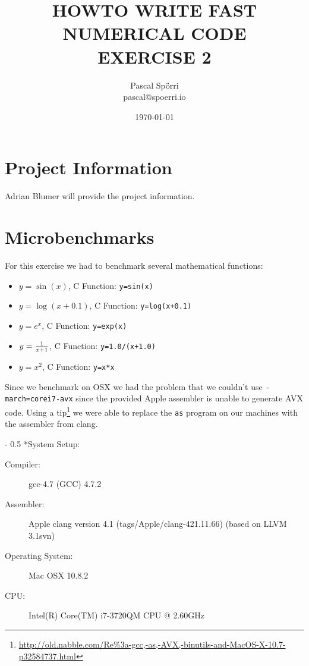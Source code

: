 \documentclass[portrait,a4paper]{article}
\makeatletter
\renewcommand\paragraph{\@startsection{paragraph}{4}{0mm}%
    {-\baselineskip}%
    {0.5\baselineskip}%
    {\normalfont\bfseries}%
}%
\makeatother
\begin{document}
 \author{Pascal Spörri\\pascal@spoerri.io}
 \title{HOWTO WRITE FAST NUMERICAL CODE\\ EXERCISE 2}
 \date{\today}
\maketitle

\section{Project Information}
Adrian Blumer will provide the project information.
\section{Microbenchmarks}
For this exercise we had to benchmark several mathematical functions:
\begin{itemize}
    \item $y=\sin(x)$, C Function: \lstinline{y=sin(x)}
    \item $y=\log(x+0.1)$, C Function: \lstinline{y=log(x+0.1)}
    \item $y=e^x$, C Function: \lstinline{y=exp(x)}
    \item $y={1\over x+1}$, C Function: \lstinline{y=1.0/(x+1.0)}
    \item $y=x^2$, C Function: \lstinline{y=x*x}
\end{itemize}
Since we benchmark on OSX we had the problem that we couldn't use \lstinline{-march=corei7-avx} since the provided Apple assembler is unable to generate AVX code. Using a tip\footnote{\url{http://old.nabble.com/Re\%3a-gcc,-as,-AVX,-binutils-and-MacOS-X-10.7-p32584737.html}} we were able to replace the \lstinline{as} program on our machines with the assembler from clang. 

\paragraph*{System Setup:}
\begin{description}
    \item[Compiler:] gcc-4.7 (GCC) 4.7.2
    \item[Assembler:] Apple clang version 4.1 (tags/Apple/clang-421.11.66) (based on LLVM 3.1svn)
    \item[Operating System:] Mac OSX 10.8.2
    \item[CPU:] Intel(R) Core(TM) i7-3720QM CPU @ 2.60GHz
\end{description}
\end{document}

